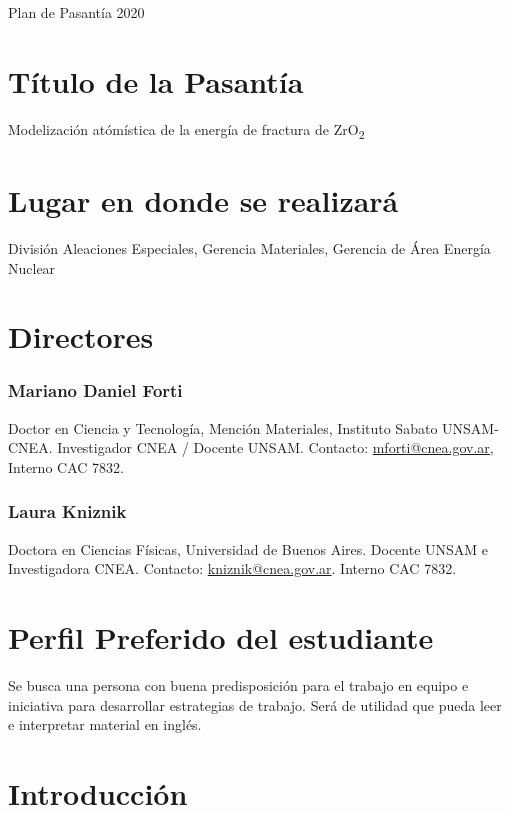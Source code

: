 \begin{center}

Plan de Pasantía 2020

\end{center}

\section{ Título de la Pasantía }

Modelización atómística de la energía de fractura de ZrO\textsubscript{2 }

\section{ Lugar en donde se realizará }
División Aleaciones Especiales, Gerencia Materiales, Gerencia de Área Energía 
Nuclear

\section{Directores}

\subsubsection{Mariano Daniel Forti}

Doctor en Ciencia y Tecnología, Mención Materiales, Instituto Sabato 
UNSAM-CNEA. Investigador CNEA / Docente UNSAM. 
Contacto: \href{mailto:mforti@cnea.gov.ar}{mforti@cnea.gov.ar}, Interno CAC 7832.

\subsubsection{Laura Kniznik}

Doctora en Ciencias Físicas, Universidad de Buenos Aires. Docente UNSAM e Investigadora CNEA.
Contacto: \href{mailto:kniznik@cnea.gov.ar}{kniznik@cnea.gov.ar}. Interno CAC 7832.

\section{Perfil Preferido del estudiante}

Se busca una persona con buena predisposición para el trabajo
en equipo e iniciativa para desarrollar estrategias de 
trabajo. Será de utilidad que pueda leer e interpretar
material en inglés.  

\section{Introducción }


